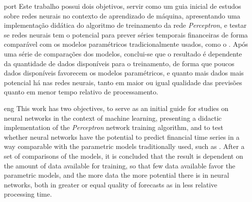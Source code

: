 


\begin{resumo}{port}
Este trabalho possui dois objetivos, servir como um guia inicial de estudos sobre redes neurais no contexto de aprendizado de máquina, apresentando uma implementação didática do algoritmo de treinamento da rede \emph{Perceptron}, e testar se redes neurais tem o potencial para prever séries temporais financeiras de forma comparável com os modelos paramétricos tradicionalmente usados, como o . Após uma série de comparações dos modelos, conclui-se que o resultado é dependente da quantidade de dados disponíveis para o treinamento, de forma que poucos dados disponíveis favorecem os modelos paramétricos, e quanto mais dados mais potencial há nas redes neurais, tanto em maior ou igual qualidade das previsões quanto em menor tempo relativo de processamento.
\end{resumo}



\begin{resumo}{eng}
This work has two objectives, to serve as an initial guide for studies on neural networks in the context of machine learning, presenting a didactic implementation of the \emph{Perceptron} network training algorithm, and to test whether neural networks have the potential to predict financial time series in a way comparable with the parametric models traditionally used, such as . After a set of comparisons of the models, it is concluded that the result is dependent on the amount of data available for training, so that few data available favor the parametric models, and the more data the more potential there is in neural networks, both in greater or equal quality of forecasts as in less relative processing time.
\end{resumo}
